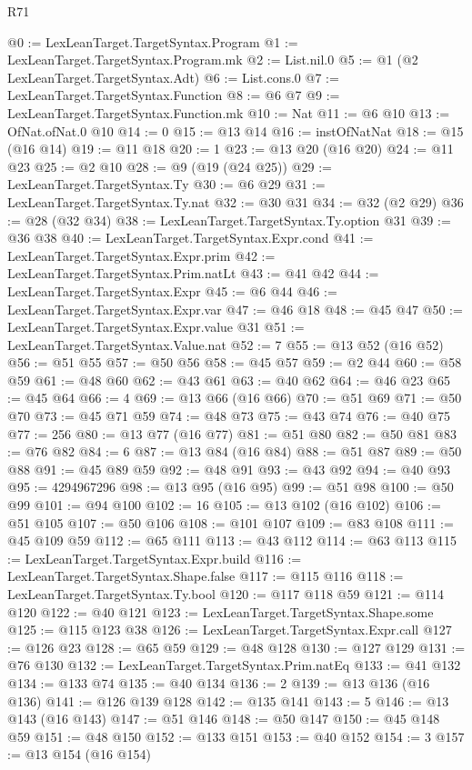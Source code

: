 \begin{lexlean}{R71}
\begin{coremodule}
@0 := LexLeanTarget.TargetSyntax.Program
@1 := LexLeanTarget.TargetSyntax.Program.mk
@2 := List.nil.{0}
@5 := @1 (@2 LexLeanTarget.TargetSyntax.Adt)
@6 := List.cons.{0}
@7 := LexLeanTarget.TargetSyntax.Function
@8 := @6 @7
@9 := LexLeanTarget.TargetSyntax.Function.mk
@10 := Nat
@11 := @6 @10
@13 := OfNat.ofNat.{0} @10
@14 := 0
@15 := @13 @14
@16 := instOfNatNat
@18 := @15 (@16 @14)
@19 := @11 @18
@20 := 1
@23 := @13 @20 (@16 @20)
@24 := @11 @23
@25 := @2 @10
@28 := @9 (@19 (@24 @25))
@29 := LexLeanTarget.TargetSyntax.Ty
@30 := @6 @29
@31 := LexLeanTarget.TargetSyntax.Ty.nat
@32 := @30 @31
@34 := @32 (@2 @29)
@36 := @28 (@32 @34)
@38 := LexLeanTarget.TargetSyntax.Ty.option @31
@39 := @36 @38
@40 := LexLeanTarget.TargetSyntax.Expr.cond
@41 := LexLeanTarget.TargetSyntax.Expr.prim
@42 := LexLeanTarget.TargetSyntax.Prim.natLt
@43 := @41 @42
@44 := LexLeanTarget.TargetSyntax.Expr
@45 := @6 @44
@46 := LexLeanTarget.TargetSyntax.Expr.var
@47 := @46 @18
@48 := @45 @47
@50 := LexLeanTarget.TargetSyntax.Expr.value @31
@51 := LexLeanTarget.TargetSyntax.Value.nat
@52 := 7
@55 := @13 @52 (@16 @52)
@56 := @51 @55
@57 := @50 @56
@58 := @45 @57
@59 := @2 @44
@60 := @58 @59
@61 := @48 @60
@62 := @43 @61
@63 := @40 @62
@64 := @46 @23
@65 := @45 @64
@66 := 4
@69 := @13 @66 (@16 @66)
@70 := @51 @69
@71 := @50 @70
@73 := @45 @71 @59
@74 := @48 @73
@75 := @43 @74
@76 := @40 @75
@77 := 256
@80 := @13 @77 (@16 @77)
@81 := @51 @80
@82 := @50 @81
@83 := @76 @82
@84 := 6
@87 := @13 @84 (@16 @84)
@88 := @51 @87
@89 := @50 @88
@91 := @45 @89 @59
@92 := @48 @91
@93 := @43 @92
@94 := @40 @93
@95 := 4294967296
@98 := @13 @95 (@16 @95)
@99 := @51 @98
@100 := @50 @99
@101 := @94 @100
@102 := 16
@105 := @13 @102 (@16 @102)
@106 := @51 @105
@107 := @50 @106
@108 := @101 @107
@109 := @83 @108
@111 := @45 @109 @59
@112 := @65 @111
@113 := @43 @112
@114 := @63 @113
@115 := LexLeanTarget.TargetSyntax.Expr.build
@116 := LexLeanTarget.TargetSyntax.Shape.false
@117 := @115 @116
@118 := LexLeanTarget.TargetSyntax.Ty.bool
@120 := @117 @118 @59
@121 := @114 @120
@122 := @40 @121
@123 := LexLeanTarget.TargetSyntax.Shape.some
@125 := @115 @123 @38
@126 := LexLeanTarget.TargetSyntax.Expr.call
@127 := @126 @23
@128 := @65 @59
@129 := @48 @128
@130 := @127 @129
@131 := @76 @130
@132 := LexLeanTarget.TargetSyntax.Prim.natEq
@133 := @41 @132
@134 := @133 @74
@135 := @40 @134
@136 := 2
@139 := @13 @136 (@16 @136)
@141 := @126 @139 @128
@142 := @135 @141
@143 := 5
@146 := @13 @143 (@16 @143)
@147 := @51 @146
@148 := @50 @147
@150 := @45 @148 @59
@151 := @48 @150
@152 := @133 @151
@153 := @40 @152
@154 := 3
@157 := @13 @154 (@16 @154)

\end{coremodule}
\end{lexlean}
